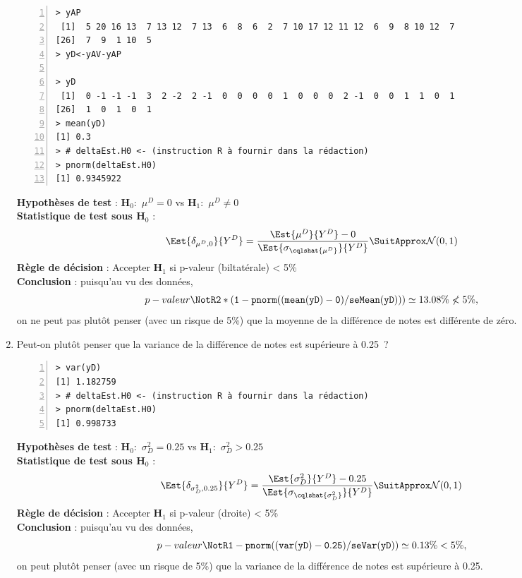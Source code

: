 \documentclass[10pt]{report}
\begin{document}
\begin{exercice}
\begin{enumerate}
\IndicR
\begin{Verbatim}[frame=leftline,fontfamily=tt,fontshape=n,numbers=left]
> yAP
 [1]  5 20 16 13  7 13 12  7 13  6  8  6  2  7 10 17 12 11 12  6  9  8 10 12  7
[26]  7  9  1 10  5
> yD<-yAV-yAP

> yD
 [1]  0 -1 -1 -1  3  2 -2  2 -1  0  0  0  0  1  0  0  0  2 -1  0  0  1  1  0  1
[26]  1  0  1  0  1
> mean(yD)
[1] 0.3
> # deltaEst.H0 <- (instruction R à fournir dans la rédaction)
> pnorm(deltaEst.H0)
[1] 0.9345922
\end{Verbatim}

 

\begin{Correction}

\noindent \textbf{Hypothèses de test} : $\mathbf{H}_0:$ $\mu^{D}=0$ vs {\large $\mathbf{H}_1:$ $\mu^{D}\neq0$}\\
\textbf{Statistique de test sous $\mathbf{H}_0$} :
  $$
  \Est{\delta_{\mu^{D},0}}{Y^{D}}= {\displaystyle \frac{\Est{\mu^{D}}{Y^{D}}-0}{
\Est{\sigma_{\cqlshat{\mu^{D}}}}{Y^{D}}
}} 
  \SuitApprox \mathcal{N}(0,1)
  $$
\textbf{Règle de décision} : Accepter $\mathbf{H}_1$ si 
  p-valeur (biltatérale) < 5\%\\
\noindent \textbf{Conclusion} :
puisqu'au vu des données, 
  \[
p-valeur\NotR\mathtt{2*(1-pnorm((mean(yD)-0)/seMean(yD)))} \simeq 13.08\%\nless5\%,
\]
on ne peut pas plutôt penser (avec un risque de 5\%) que la moyenne de la différence de notes est différente de zéro.
\end{Correction}



\item Peut-on plutôt penser que la variance de la différence de notes est supérieure à 0.25~?

\IndicR
\begin{Verbatim}[frame=leftline,fontfamily=tt,fontshape=n,numbers=left]
> var(yD)
[1] 1.182759
> # deltaEst.H0 <- (instruction R à fournir dans la rédaction)
> pnorm(deltaEst.H0)
[1] 0.998733
\end{Verbatim}

 

\begin{Correction}

\noindent \textbf{Hypothèses de test} : $\mathbf{H}_0:$ $\sigma^2_{D}=0.25$ vs {\large $\mathbf{H}_1:$ $\sigma^2_{D}>0.25$}\\
\textbf{Statistique de test sous $\mathbf{H}_0$} :
  $$
  \Est{\delta_{\sigma^2_{D},0.25}}{Y^{D}}= {\displaystyle \frac{\Est{\sigma^2_{D}}{Y^{D}}-0.25}{
\Est{\sigma_{\cqlshat{\sigma^2_{D}}}}{Y^{D}}
}} 
  \SuitApprox \mathcal{N}(0,1)
  $$
\textbf{Règle de décision} : Accepter $\mathbf{H}_1$ si 
  p-valeur (droite) < 5\%\\
\noindent \textbf{Conclusion} :
puisqu'au vu des données, 
  \[
p-valeur\NotR\mathtt{1-pnorm((var(yD)-0.25)/seVar(yD))} \simeq 0.13\% < 5\%,
\]
on peut plutôt penser (avec un risque de 5\%) que la variance de la différence de notes est supérieure à 0.25.
\end{Correction}




\end{enumerate}
\end{exercice}
\end{document}
